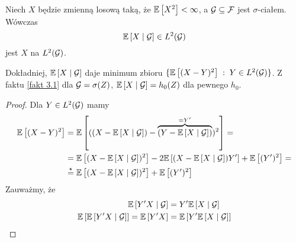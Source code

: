 \begin{theorem}
  Niech $X$ będzie zmienną losową taką, że $\expected{X^2}<\infty$, a $\mathcal{G}\subseteq\mathcal{F}$ jest $\sigma$-ciałem. Wówczas 
  $$\expected{X}{\set{G}}\in L^2(\set{G})$$
  jest  $X$ na $L^2(\mathcal{G})$.
\end{theorem}

\begin{center}\end{center}

Dokładniej, $\expected{X}{\set{G}}$ daje minimum zbioru $\{\expected{(X-Y)^2}\;:\;Y\in L^2(\set{G})\}$. Z faktu \ref{fakt 3.1} dla $\mathcal{G}=\sigma(Z)$, $\expected{X}{\set{G}}=h_0(Z)$ dla pewnego $h_0$.

\begin{proof}
  Dla $Y\in L^2(\mathcal{G})$ mamy 
  \begin{align*}
    \expected{(X-Y)^2}&=\expected{((X-\expected{X}{\set{G}})-\overbrace{(Y-\expected{X}{\set{G}})}^{=Y'})^2}=\\
                      &=\expected{(X-\expected{X}{\set{G}})^2}-2\expected{(X-\expected{X}{\set{G}})Y'}+\expected{(Y')^2}=\\
                      &\overset{\star}{=}\expected{(X-\expected{X}{\set{G}})^2}+\expected{(Y')^2}
  \end{align*}
  Zauważmy, że
  \begin{align*}\expected{Y'X}{\set{G}}&=Y'\expected{X}{\set{G}}\\
    \expected{\expected{Y'X}{\set{G}}}=\expected{Y'X}&=\expected{Y'\expected{X}{\set{G}}}
\end{align*}
\end{proof}

